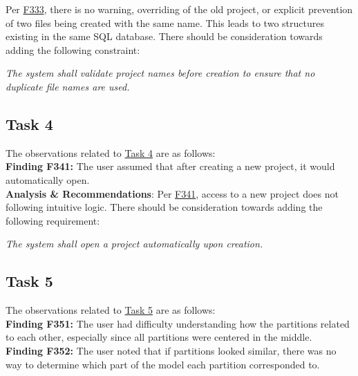 \documentclass{article}
\begin{document}
\noindent Per \hyperlink{finding:F333}{F333}, there is no warning, overriding of the old project, or explicit prevention of two files being created with the same name. This leads to two structures existing in the same SQL database. There should be consideration towards adding the following constraint:

\begin{center}
  \textit{The system shall validate project names before creation to ensure that no duplicate file names are used. }\\
\end{center}


\subsection{Task 4}

\noindent The observations related to \hyperlink{task:T4}{Task 4} are as follows:\\

\noindent \hypertarget{finding:F341}{\textbf{Finding F341:}} 
The user assumed that after creating a new project, it would automatically open.\\ 

\noindent \textbf{Analysis \& Recommendations}:
Per \hyperlink{finding:F341}{F341}, access to a new project does not following intuitive logic. There should be consideration towards adding the following requirement:

\begin{center}
  \textit{The system shall open a project automatically upon creation. }\\
\end{center}

\subsection{Task 5}

\noindent The observations related to \hyperlink{task:T5}{Task 5} are as follows:\\

\noindent \hypertarget{finding:F351}{\textbf{Finding F351:}} 
The user had difficulty understanding how the partitions related to each other, especially since all partitions were centered in the middle.\\ 

\noindent \hypertarget{finding:F352}{\textbf{Finding F352:}} 
The user noted that if partitions looked similar, there was no way to determine which part of the model each partition corresponded to.\\ 
\end{document}
